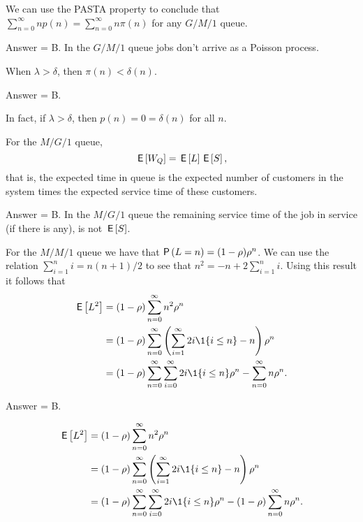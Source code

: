 \begin{exercise}[201903]
 We can use the PASTA property to conclude that $\sum_{n=0}^\infty n p(n) = \sum_{n=0}^\infty n \pi(n)$ for any $G/M/1$ queue. 
\begin{solution}
Answer = B. In the $G/M/1$ queue jobs don't arrive as a Poisson process. 
\end{solution}
\end{exercise}

\begin{exercise}[201903]
 When $\lambda > \delta$, then $\pi(n) < \delta(n)$.

\begin{solution}
 Answer = B.

 In fact, if $\lambda>\delta$, then $p(n) = 0 = \delta(n)$ for all $n$. 
\end{solution}
\end{exercise}

\begin{exercise}[201903]
 For the $M/G/1$ queue, 
 \begin{equation*}
 \,\mathsf{E}\left[W_Q\right] = \,\mathsf{E}\left[L\right] \,\mathsf{E}\left[S\right],
 \end{equation*}
 that is, the expected time in queue is the expected number of customers in the system times the expected service time of these customers. 
\begin{solution}
Answer = B. In the $M/G/1$ queue the remaining service time of the job in service (if there is any), is not $\,\mathsf{E}\left[S\right]$.
\end{solution}
\end{exercise}

\begin{exercise}[201903]
 For the $M/M/1$ queue we have that $\P{L=n} = (1-\rho)\rho^n$. We can use the relation 
 $\sum_{i=1}^n i= n(n+1)/2$ to see that $n^2 = -n + 2\sum_{i=1}^n i$. Using this result it follows that
\begin{equation*}
\begin{split}
\E{L^2} &= 
 (1-\rho)\sum_{n=0}^\infty n^2 \rho^n \\
&= (1-\rho) \sum_{n=0}^\infty \left(\sum_{i=1}^\infty 2i \1{i\leq n} - n\right)\rho^n \\
&= (1-\rho) \sum_{n=0}^\infty \sum_{i=0}^\infty 2i\1{i\leq n}\rho^n - \sum_{n=0}^\infty n\rho^n. 
\end{split}
\end{equation*}

\begin{solution}
Answer = B.

\begin{equation*}
\begin{split}
\E{L^2} &= 
 (1-\rho)\sum_{n=0}^\infty n^2 \rho^n \\
&= (1-\rho) \sum_{n=0}^\infty \left(\sum_{i=1}^\infty 2i \1{i\leq n} - n\right)\rho^n \\
&= (1-\rho) \sum_{n=0}^\infty \sum_{i=0}^\infty 2i\1{i\leq n}\rho^n - (1-\rho) \sum_{n=0}^\infty n\rho^n. 
\end{split}
\end{equation*}



\end{solution}
\end{exercise}

